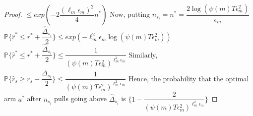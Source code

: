 \begin{proof}
$\leq exp(-2\dfrac{(\ell_{m}\epsilon_{m})^{2}}{4} n^{*})$
\newline Now, putting $n_{s_{i}}=n^{*}=\dfrac{2\log (\psi(m)T\epsilon_{m}^{2})}{\epsilon_{m}}$
\newline$\mathbb{P}\lbrace\hat{r}^{*}\leq{r}^{*} + \dfrac{\hat{\Delta}_{s_{i}}}{2}\rbrace\leq exp(-\ell_{m}^{2}\epsilon_{m} \log(\psi(m)T\epsilon_{m}^{2}))$
\newline $\mathbb{P}\lbrace\hat{r}^{*}\leq{r}^{*} + \dfrac{\hat{\Delta}_{s_{i}}}{2}\rbrace\leq \dfrac{1}{(\psi(m)T\epsilon_{m}^{2})^{\ell_{m}^{2}\epsilon_{m}}}$
\newline
Similarly, $\mathbb{P}\lbrace\hat{r}_{s}\geq{r}_{s} - \dfrac{\hat{\Delta}_{s_{i}}}{2}\rbrace\leq \dfrac{1}{(\psi(m)T\epsilon_{m}^{2})^{\ell_{m}^{2}\epsilon_{m}}}$
\newline
Hence, the probability that the optimal arm $a^{*}$ after $n_{s_{i}}$ pulls going above $\hat{\Delta}_{s_{i}}$ is $\bigg\lbrace 1- \dfrac{2}{(\psi(m)T\epsilon_{m}^{2})^{\ell_{m}^{2}\epsilon_{m}}} \bigg\rbrace$

\end{proof}

